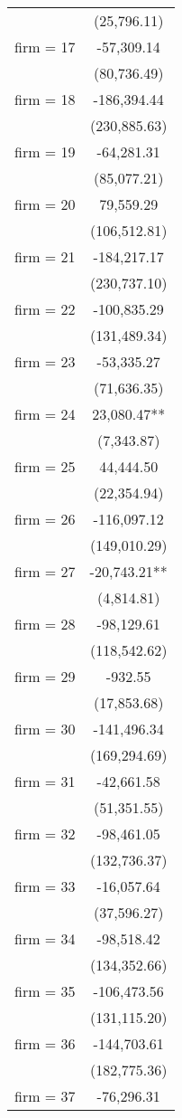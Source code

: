 \begin{tabular}{lc}
 & (25,796.11) \\
firm = 17 & -57,309.14 \\
 & (80,736.49) \\
firm = 18 & -186,394.44 \\
 & (230,885.63) \\
firm = 19 & -64,281.31 \\
 & (85,077.21) \\
firm = 20 & 79,559.29 \\
 & (106,512.81) \\
firm = 21 & -184,217.17 \\
 & (230,737.10) \\
firm = 22 & -100,835.29 \\
 & (131,489.34) \\
firm = 23 & -53,335.27 \\
 & (71,636.35) \\
firm = 24 & 23,080.47** \\
 & (7,343.87) \\
firm = 25 & 44,444.50 \\
 & (22,354.94) \\
firm = 26 & -116,097.12 \\
 & (149,010.29) \\
firm = 27 & -20,743.21** \\
 & (4,814.81) \\
firm = 28 & -98,129.61 \\
 & (118,542.62) \\
firm = 29 & -932.55 \\
 & (17,853.68) \\
firm = 30 & -141,496.34 \\
 & (169,294.69) \\
firm = 31 & -42,661.58 \\
 & (51,351.55) \\
firm = 32 & -98,461.05 \\
 & (132,736.37) \\
firm = 33 & -16,057.64 \\
 & (37,596.27) \\
firm = 34 & -98,518.42 \\
 & (134,352.66) \\
firm = 35 & -106,473.56 \\
 & (131,115.20) \\
firm = 36 & -144,703.61 \\
 & (182,775.36) \\
firm = 37 & -76,296.31 \\

\end{tabular}
